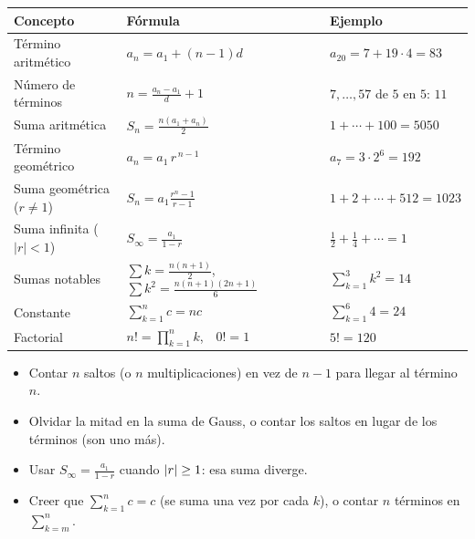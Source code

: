 \documentclass[11pt,a4paper]{article}
\begin{document}
\repaso
\begin{center}\renewcommand{\arraystretch}{1.12}
\begin{tabularx}{\linewidth}{@{}l L l@{}}
\toprule
Concepto & Fórmula & Ejemplo\\ \midrule
Término aritmético & $a_n=a_1+(n-1)d$ & $a_{20}=7+19\cdot4=83$\\
Número de términos & $n=\frac{a_n-a_1}{d}+1$ & $7,\dots,57$ de $5$ en $5$: $11$\\
Suma aritmética & $S_n=\frac{n(a_1+a_n)}{2}$ & $1+\cdots+100=5050$\\
Término geométrico & $a_n=a_1\,r^{\,n-1}$ & $a_7=3\cdot2^6=192$\\
Suma geométrica ($r\neq1$) & $S_n=a_1\frac{r^n-1}{r-1}$ & $1+2+\cdots+512=1023$\\
Suma infinita ($|r|<1$) & $S_\infty=\frac{a_1}{1-r}$ & $\frac12+\frac14+\cdots=1$\\
Sumas notables & $\sum k=\frac{n(n+1)}{2}$,\ \ $\sum k^2=\frac{n(n+1)(2n+1)}{6}$ & $\sum_{k=1}^{3}k^2=14$\\
Constante & $\sum_{k=1}^{n}c=nc$ & $\sum_{k=1}^{6}4=24$\\
Factorial & $n!=\prod_{k=1}^{n}k$,\ \ $0!=1$ & $5!=120$\\
\bottomrule
\end{tabularx}
\end{center}

\begin{ojo}
\begin{itemize}
\item Contar $n$ saltos (o $n$ multiplicaciones) en vez de $n-1$ para llegar al término $n$.
\item Olvidar la mitad en la suma de Gauss, o contar los saltos en lugar de los términos (son uno más).
\item Usar $S_\infty=\frac{a_1}{1-r}$ cuando $\left\lvert r\right\rvert\ge1$: esa suma diverge.
\item Creer que $\sum_{k=1}^{n}c=c$ (se suma una vez por cada $k$), o contar $n$ términos en $\sum_{k=m}^{n}$.
\end{itemize}
\end{ojo}
\end{document}
